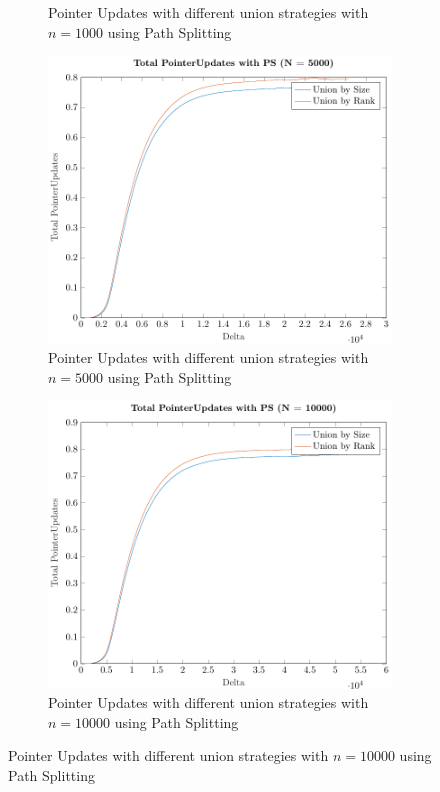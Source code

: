 \begin{figure}[ht]
\begin{subfigure}{0.32\textwidth}
        \caption{Pointer Updates with different union strategies with $n = 1000$ using Path Splitting}
    \end{subfigure}%
    \hfill
    \begin{subfigure}{0.32\textwidth}
        \centering
        \includegraphics[width=\textwidth]{../images/plotPSNonFull5000_PointerUpdates.pdf}
        \caption{Pointer Updates with different union strategies with $n = 5000$ using Path Splitting}
    \end{subfigure}%
    \hfill
    \begin{subfigure}{0.32\textwidth}
        \centering
        \includegraphics[width=\textwidth]{../images/plotPSNonFull10000_PointerUpdates.pdf}
        \caption{Pointer Updates with different union strategies with $n = 10000$ using Path Splitting}
    \end{subfigure}


\end{figure}
